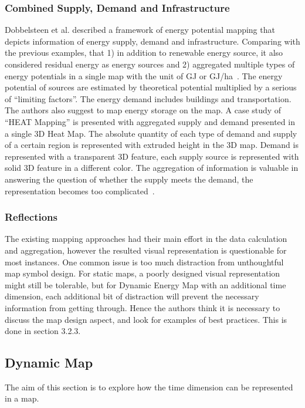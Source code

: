 \documentclass[hidelinks,12pt]{article}
\begin{document}
\subsubsection{Combined Supply, Demand and Infrastructure}
Dobbelsteen et al. described a framework of energy potential mapping
that depicts information of energy supply, demand and infrastructure.
Comparing with the previous examples, that 1) in addition to renewable
energy source, it also considered residual energy as energy sources
and 2) aggregated multiple types of energy potentials in a single map
with the unit of GJ or GJ/ha~\cite{Dobbelsteen2013}. The energy
potential of sources are estimated by theoretical potential multiplied
by a serious of ``limiting factors''. The energy demand includes
buildings and transportation. The authors also suggest to map energy
storage on the map. A case study of ``HEAT Mapping'' is presented with
aggregated supply and demand presented in a single 3D Heat Map. The
absolute quantity of each type of demand and supply of a certain
region is represented with extruded height in the 3D map. Demand is
represented with a transparent 3D feature, each supply source is
represented with solid 3D feature in a different color. The
aggregation of information is valuable in answering the question of
whether the supply meets the demand, the representation becomes too
complicated~\cite{Dobbelsteen2013}.

\subsubsection{Reflections}\label{Reflection}
The existing mapping approaches had their main effort in the data
calculation and aggregation, however the resulted visual
representation is questionable for most instances. One common issue is
too much distraction from unthoughtful map symbol design. For
static maps, a poorly designed visual representation might still be
tolerable, but for Dynamic Energy Map with an additional time
dimension, each additional bit of distraction will prevent the
necessary information from getting through. Hence the authors think it
is necessary to discuss the map design aspect, and look for examples
of best practices. This is done in section 3.2.3.

\subsection{Dynamic Map}
The aim of this section is to explore how the time dimension can be
represented in a map.
\end{document}
